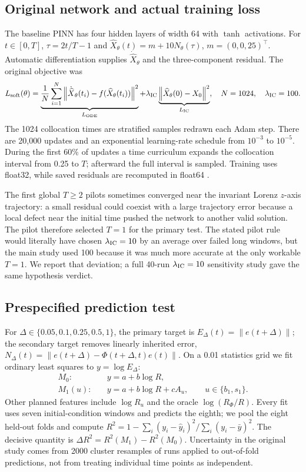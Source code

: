 \documentclass[11pt,a4paper]{article}
\newcommand{\norm}[1]{\left\lVert #1\right\rVert}
\begin{document}
\subsection{Original network and actual training loss}
The baseline PINN has four hidden layers of width 64 with $\tanh$ activations. For $t\in[0,T]$, $\tau=2t/T-1$ and $\widehat X_\theta(t)=m+10N_\theta(\tau)$, $m=(0,0,25)^\top$. Automatic differentiation supplies $\dot{\widehat X}_\theta$ and the three-component residual. The original objective was
\begin{equation}\label{eq:softloss}
L_{\rm soft}(\theta)=\underbrace{\frac1N\sum_{i=1}^N\norm{\dot{\widehat X}_\theta(t_i)-f(\widehat X_\theta(t_i))}^2}_{L_{\rm ODE}}
+\lambda_{\rm IC}\underbrace{\norm{\widehat X_\theta(0)-X_0}^2}_{L_{\rm IC}},
\quad N=1024,\quad\lambda_{\rm IC}=100.
\end{equation}
The 1024 collocation times are stratified samples redrawn each Adam step. There are 20,000 updates and an exponential learning-rate schedule from $10^{-3}$ to $10^{-5}$. During the first 60\% of updates a time curriculum expands the collocation interval from 0.25 to $T$; afterward the full interval is sampled. Training uses float32, while saved residuals are recomputed in float64 \cite{phase4}.

The first global $T\geq2$ pilots sometimes converged near the invariant Lorenz $z$-axis trajectory: a small residual could coexist with a large trajectory error because a local defect near the initial time pushed the network to another valid solution. The pilot therefore selected $T=1$ for the primary test. The stated pilot rule would literally have chosen $\lambda_{\rm IC}=10$ by an average over failed long windows, but the main study used 100 because it was much more accurate at the only workable $T=1$. We report that deviation; a full 40-run $\lambda_{\rm IC}=10$ sensitivity study gave the same hypothesis verdict.

\subsection{Prespecified prediction test}
For $\Delta\in\{0.05,0.1,0.25,0.5,1\}$, the primary target is $E_\Delta(t)=\norm{e(t+\Delta)}$; the secondary target removes linearly inherited error, $N_\Delta(t)=\norm{e(t+\Delta)-\Phi(t+\Delta,t)e(t)}$. On a 0.01 statistics grid we fit ordinary least squares to $y=\log E_\Delta$:
\begin{align}
M_0:&\quad y=a+b\log R,\label{eq:m0}\\
M_1(u):&\quad y=a+b\log R+cA_u,\qquad u\in\{b_1,s_1\}.\label{eq:m1}
\end{align}
Other planned features include $\log R_u$ and the oracle $\log(R_\Phi/R)$. Every fit uses seven initial-condition windows and predicts the eighth; we pool the eight held-out folds and compute $R^2=1-\sum_i(y_i-\widehat y_i)^2/\sum_i(y_i-\bar y)^2$. The decisive quantity is $\Delta R^2=R^2(M_1)-R^2(M_0)$. Uncertainty in the original study comes from 2000 cluster resamples of runs applied to out-of-fold predictions, not from treating individual time points as independent.
\end{document}
